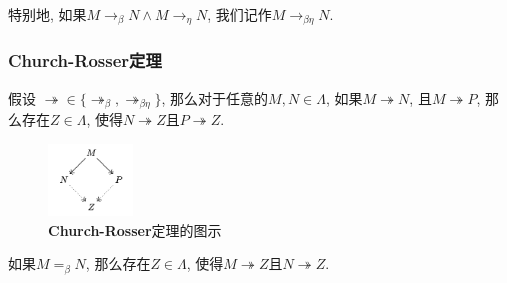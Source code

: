 \begin{definition}
    特别地, 如果$M\to_\beta N\land M\to_\eta N$, 我们记作$M\to_{\beta\eta}N$.
\end{definition}

\subsubsection{\textbf{Church-Rosser}定理}
\begin{theorem}
    假设 $\twoheadrightarrow\in \{\twoheadrightarrow_\beta, \twoheadrightarrow_{\beta\eta}\}$, 那么对于任意的$M, N\in \Lambda$, 如果$M\twoheadrightarrow N$, 且$M\twoheadrightarrow P$, 那么存在$Z\in \Lambda$, 使得$N\twoheadrightarrow Z$且$P\twoheadrightarrow Z$.
\end{theorem}

\begin{figure}[H]
    \centering
    \includegraphics[width=0.2\textwidth]{figures/cr1.png}
    \caption{\textbf{Church-Rosser}定理的图示}\label{fig:church-rosser}
\end{figure}
\begin{corollary}
    如果$M=_\beta N$, 那么存在$Z\in \Lambda$, 使得$M\twoheadrightarrow Z$且$N\twoheadrightarrow Z$.
\end{corollary}
